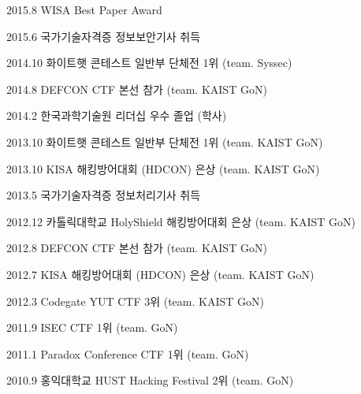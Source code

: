   \begin{activity}
    \item[2015.8] WISA Best Paper Award
    \item[2015.6] 국가기술자격증 정보보안기사 취득
    \item[2014.10] 화이트햇 콘테스트 일반부 단체전 1위 (team. Syssec)
    \item[2014.8] DEFCON CTF 본선 참가 (team. KAIST GoN)
    \item[2014.2] 한국과학기술원 리더십 우수 졸업 (학사)
    \item[2013.10] 화이트햇 콘테스트 일반부 단체전 1위 (team. KAIST GoN)
    \item[2013.10] KISA 해킹방어대회 (HDCON) 은상 (team. KAIST GoN)
    \item[2013.5] 국가기술자격증 정보처리기사 취득
    \item[2012.12] 카톨릭대학교 HolyShield 해킹방어대회 은상 (team. KAIST GoN)
    \item[2012.8] DEFCON CTF 본선 참가 (team. KAIST GoN)
    \item[2012.7] KISA 해킹방어대회 (HDCON) 은상 (team. KAIST GoN)
    \item[2012.3] Codegate YUT CTF 3위 (team. KAIST GoN)
    \item[2011.9] ISEC CTF 1위 (team. GoN)
    \item[2011.1] Paradox Conference CTF 1위 (team. GoN)
    \item[2010.9] 홍익대학교 HUST Hacking Festival 2위 (team. GoN)
  \end{activity}

